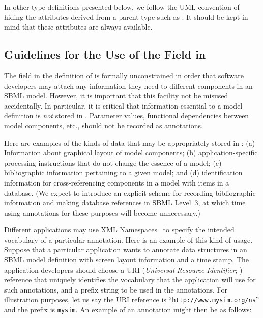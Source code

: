 \documentclass[10pt]{cekarticle}
\begin{document}
In other type definitions presented below, we follow the UML
convention of hiding the attributes derived from a parent type
such as . It should be kept in mind that these
attributes are always available.

\subsection{Guidelines for the Use of the  Field in
  }

The  field in the definition of  is
formally unconstrained in order that software developers may attach any
information they need to different components in an SBML model. However,
it is important that this facility not be misused accidentally.  In
particular, it is critical that information essential to a model definition
is \emph{not} stored in .  Parameter values, functional
dependencies between model components, etc., should not be recorded as
annotations.

Here are examples of the kinds of data that may be appropriately
stored in : (a) Information about graphical
layout of model components; (b) application-specific processing
instructions that do not change the essence of a model; (c)
bibliographic information pertaining to a given model; and (d)
identification information for cross-referencing components in a
model with items in a database.  (We expect to introduce an
explicit scheme for recording bibliographic information and making
database references in SBML Level~3, at which time using
annotations for these purposes will become unnecessary.)

Different applications may use XML Namespaces~\citep{bray:1999} to specify
the intended vocabulary of a particular annotation.  Here is an example of
this kind of usage.  Suppose that a particular application wants to
annotate data structures in an SBML model definition with screen layout
information and a time stamp.  The application developers should choose a
URI (\emph{Universal Resource Identifier}; \citealt{harold:2001,w3c:2000})
reference that uniquely identifies the vocabulary that the
application will use for such annotations, and a prefix string to be used
in the annotations.  For illustration purposes, let us say the URI
reference is ``\texttt{http://www.mysim.org/ns}'' and the prefix is
\texttt{mysim}.  An example of an annotation might then be as follows:
\end{document}
